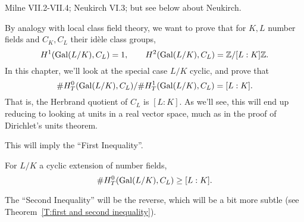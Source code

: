 %
%
%
%
%
%
%

Milne VII.2-VII.4; Neukirch VI.3; but see below about Neukirch.

\medskip

By analogy with local class field theory, we want to prove that for $K,L$
number fields and $C_K, C_L$ their id\`ele class groups,
\[
H^1(\operatorname{Gal}(L/K), C_L) = 1, \qquad H^2(\operatorname{Gal}(L/K), C_L) = \mathbb{Z}/[L:K]\mathbb{Z}.
\]
In this chapter, we'll look at the special case $L/K$ cyclic, and prove
that
\[
\#H^0_T(\operatorname{Gal}(L/K), C_L)/\#H^1_T(\operatorname{Gal}(L/K), C_L) = [L:K].
\]
That is,
the Herbrand quotient of $C_L$ is $[L:K]$. As we'll see, this
will end up reducing to looking at units in a real vector space, much
as in the proof of Dirichlet's units theorem.

This will imply the ``First Inequality''.
\begin{theorem} \label{T:first inequality}
For $L/K$ a cyclic extension of number fields,
\[
\#H^0_T(\operatorname{Gal}(L/K), C_L) \geq [L:K].
\]
\end{theorem}
The ``Second Inequality'' will be the reverse, which will be a bit
more subtle (see Theorem~\ref{T:first and second inequality}).

